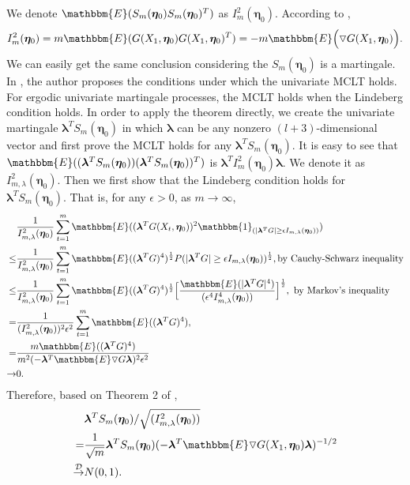 \documentclass{article}
\theoremstyle{definition}
\begin{document}
We denote $\mathbbm{E}(S_m(\bm{\eta}_0)S_m(\bm{\eta}_0)^T)$ as $I_m^2(\bm{\eta}_0)$. According to \cite{brown1971martingale}, $$I_m^2(\bm{\eta}_0) = m\mathbbm{E}(G(X_1,\bm{\eta}_0)G(X_1,\bm{\eta}_0)^T) = -m \mathbbm{E}\Big(\triangledown G(X_1,\bm{\eta}_0)\Big).$$
We can easily get the same conclusion considering the $S_m(\bm{\eta}_0)$ is a martingale.
In \cite{brown1971martingale}, the author proposes the conditions under which the univariate MCLT holds. For ergodic univariate martingale processes, the MCLT holds when the Lindeberg condition holds. In order to apply the theorem directly, we create the univariate martingale $\bm{\lambda}^T S_m(\bm{\eta}_0)$ in which $\bm{\lambda}$ can be any nonzero $(l+3)$-dimensional vector and first prove the MCLT holds for any $\bm{\lambda}^T S_m(\bm{\eta}_0)$. It is easy to see that $\mathbbm{E}((\bm{\lambda}^T S_m(\bm{\eta}_0))(\bm{\lambda}^T S_m(\bm{\eta}_0))^T)$ is $\bm{\lambda}^TI_m^2(\bm{\eta}_0)\bm{\lambda}.$ We denote it as $I_{m,\lambda}^2(\bm{\eta}_0).$ Then we first show that the Lindeberg condition holds for $\bm{\lambda}^TS_m(\bm{\eta}_0)$.
That is, for any $\epsilon>0$, as $m \rightarrow \infty$,
\begin{equation*}
\begin{aligned}
&\frac{1}{I_{m,\lambda}^2(\bm{\eta}_0)}\sum_{t=1}^m \mathbbm{E}((\bm{\lambda}^TG(X_t,\bm{\eta}_0))^2\mathbbm{1}_{(|\bm{\lambda}^T G|\geq \epsilon I_{m,\lambda}(\bm{\eta}_0))}) \\
\leq &\frac{1}{I_{m,\lambda}^2(\bm{\eta}_0)}\sum_{t=1}^m \mathbbm{E}((\bm{\lambda}^T G)^4)^{\frac{1}{2}}P(|\bm{\lambda}^T G|\geq \epsilon I_{m,\lambda}(\bm{\eta}_0))^{\frac{1}{2}}, \text{by Cauchy-Schwarz inequality} \\
\leq & \frac{1}{I_{m,\lambda}^2(\bm{\eta}_0)}\sum_{t=1}^m \mathbbm{E}((\bm{\lambda}^T G)^4)^{\frac{1}{2}}\Big [\frac{\mathbbm{E}(|\bm{\lambda}^TG|^4)}{(\epsilon^4 I_{m,\lambda}^4(\bm{\eta}_0))}\Big]^{\frac{1}{2}},\text{ by Markov's inequality} \\
= & \frac{1}{(I_{m,\lambda}^2(\bm{\eta}_0))^2\epsilon^2}\sum_{t=1}^m\mathbbm{E}((\bm{\lambda}^T G)^4),\\
= & \frac{m\mathbbm{E}((\bm{\lambda}^TG)^4)}{m^2 (-\bm{\lambda}^T \mathbbm{E}\triangledown G\bm{\lambda})^2 \epsilon^2} \\
{\rightarrow}& 0.
\end{aligned}    
\end{equation*}
Therefore, based on Theorem 2 of \cite{brown1971martingale}, 
\begin{equation}
    \label{eq: MCLT of the univariate martingale}
    \begin{aligned}
    &\bm{\lambda}^T S_m(\bm{\eta}_0)/\sqrt{(I^2_{m,\lambda}(\bm{\eta}_0))} \\
    =&\frac{1}{\sqrt{m}}\bm{\lambda}^T S_m(\bm{\eta}_0)(-\bm{\lambda}^T \mathbbm{E}\triangledown G(X_1,\bm{\eta}_0) \bm{\lambda})^{-1/2} \\
    \overset{\mathcal{D}}{\rightarrow}&N(0,1).    
    \end{aligned}
\end{equation}
\end{document}
